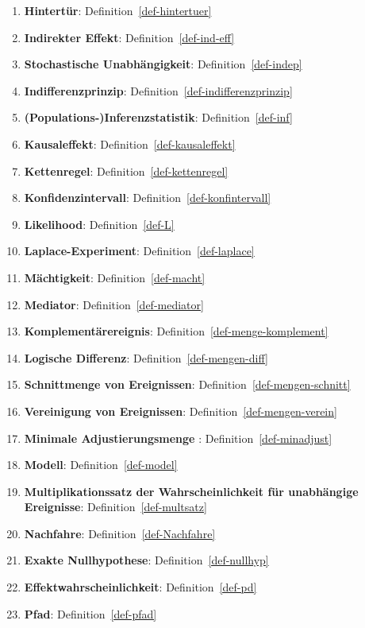\documentclass[
  ngerman,
  letterpaper,
  twoside,
  open=any]{scrbook}
\theoremstyle{definition}
\theoremstyle{plain}
\theoremstyle{definition}
\theoremstyle{definition}
\theoremstyle{definition}
\theoremstyle{definition}
\theoremstyle{remark}
\begin{document}
\begin{enumerate}
  \textbf{Intervalle höchster Dichte (Highest Density Intervals)}:
  Definition~\ref{def-hdi}
\item
  \textbf{Hintertür}: Definition~\ref{def-hintertuer}
\item
  \textbf{Indirekter Effekt}: Definition~\ref{def-ind-eff}
\item
  \textbf{Stochastische Unabhängigkeit}: Definition~\ref{def-indep}
\item
  \textbf{Indifferenzprinzip}: Definition~\ref{def-indifferenzprinzip}
\item
  \textbf{(Populations-)Inferenzstatistik}: Definition~\ref{def-inf}
\item
  \textbf{Kausaleffekt}: Definition~\ref{def-kausaleffekt}
\item
  \textbf{Kettenregel}: Definition~\ref{def-kettenregel}
\item
  \textbf{Konfidenzintervall}: Definition~\ref{def-konfintervall}
\item
  \textbf{Likelihood}: Definition~\ref{def-L}
\item
  \textbf{Laplace-Experiment}: Definition~\ref{def-laplace}
\item
  \textbf{Mächtigkeit}: Definition~\ref{def-macht}
\item
  \textbf{Mediator}: Definition~\ref{def-mediator}
\item
  \textbf{Komplementärereignis}: Definition~\ref{def-menge-komplement}
\item
  \textbf{Logische Differenz}: Definition~\ref{def-mengen-diff}
\item
  \textbf{Schnittmenge von Ereignissen}:
  Definition~\ref{def-mengen-schnitt}
\item
  \textbf{Vereinigung von Ereignissen}:
  Definition~\ref{def-mengen-verein}
\item
  \textbf{Minimale Adjustierungsmenge }: Definition~\ref{def-minadjust}
\item
  \textbf{Modell}: Definition~\ref{def-model}
\item
  \textbf{Multiplikationssatz der Wahrscheinlichkeit für unabhängige
  Ereignisse}: Definition~\ref{def-multsatz}
\item
  \textbf{Nachfahre}: Definition~\ref{def-Nachfahre}
\item
  \textbf{Exakte Nullhypothese}: Definition~\ref{def-nullhyp}
\item
  \textbf{Effektwahrscheinlichkeit}: Definition~\ref{def-pd}
\item
  \textbf{Pfad}: Definition~\ref{def-pfad}

\end{enumerate}
\end{document}
